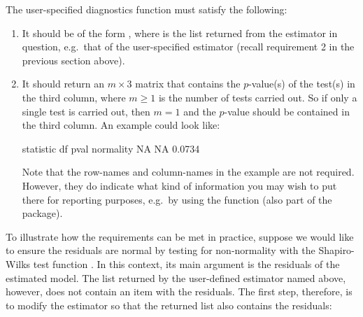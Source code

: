 The user-specified diagnostics function must satisfy the following:
%
\begin{enumerate}
	\item It should be of the form , where  is the list returned from the estimator in question, e.g.\ that of the user-specified estimator (recall requirement 2 in the previous section above).
	
	\item It should return an $m \times 3$ matrix that contains the $p$-value(s) of the test(s) in the third column, where $m\geq 1$ is the number of tests carried out. So if only a single test is carried out, then $m=1$ and the $p$-value should be contained in the third column. An example could look like:
\begin{example}
            statistic df   pval
  normality        NA NA 0.0734
\end{example}
	Note that the row-names and column-names in the example are not required. However, they do indicate what kind of information you may wish to put there for reporting purposes, e.g.\ by using the function  (also part of the  package).
\end{enumerate}
%
To illustrate how the requirements can be met in practice, suppose we would like to ensure the residuals are normal by testing for non-normality with the Shapiro-Wilks test function . In this context, its main argument is the residuals of the estimated model. The list returned by the user-defined estimator named  above, however, does not contain an item with the residuals. The first step, therefore, is to modify the estimator  so that the returned list also contains the residuals:
%
